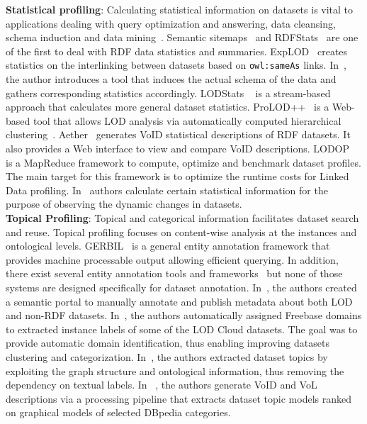 \textbf{Statistical profiling}: Calculating statistical information on datasets is vital to applications dealing with query optimization and answering, data cleansing, schema induction and data mining~\cite{Jentzsch:ISWC:14,Frosterus:Springer:11,Lalithsena:WI:13}. Semantic sitemaps~\cite{Cyganiak:ESWC:08} and RDFStats~\cite{Lanegger:DEXA:09} are one of the first to deal with RDF data statistics and summaries. ExpLOD~\cite{Khatchadourian:ESWC:10} creates statistics on the interlinking between datasets based on \texttt{owl:sameAs} links. In~\cite{Li:WISM:12}, the author introduces a tool that induces the actual schema of the data and gathers corresponding statistics accordingly. LODStats ~\cite{Auer:EKAW:12} is a stream-based approach that calculates more general dataset statistics. ProLOD++~\cite{Abedjan:ICDE:14} is a Web-based tool that allows LOD analysis via automatically computed hierarchical clustering~\cite{Bohm:ICDEW:10}. Aether~\cite{Makela:ESWC:14} generates VoID statistical descriptions of RDF datasets. It also provides a Web interface to view and compare VoID descriptions. LODOP~\cite{Forchhammer:PROFILES:14} is a MapReduce framework to compute, optimize and benchmark dataset profiles. The main target for this framework is to optimize the runtime costs for Linked Data profiling. In~\cite{Kaafer:ESWC:13} authors calculate certain statistical information for the purpose of observing the dynamic changes in datasets.\\

\textbf{Topical Profiling}: Topical and categorical information facilitates dataset search and reuse. Topical profiling focuses on content-wise analysis at the instances and ontological levels. GERBIL~\cite{Usbeck:WWW:15} is a general entity annotation framework that provides machine processable output allowing efficient querying. In addition, there exist several entity annotation tools and frameworks~\cite{Cornolti:WWW:13} but none of those systems are designed specifically for dataset annotation. In~\cite{Frosterus:ESWC:11}, the authors created a semantic portal to manually annotate and publish metadata about both LOD and non-RDF datasets. In~\cite{Lalithsena:WI:13}, the authors automatically assigned Freebase domains to extracted instance labels of some of the LOD Cloud datasets. The goal was to provide automatic domain identification, thus enabling improving datasets clustering and categorization. In~\cite{Bohm:CIKM:12}, the authors extracted dataset topics by exploiting the graph structure and ontological information, thus removing the dependency on textual labels. In ~\cite{Fetahu:ESWC:14}, the authors generate VoID and VoL descriptions via a processing pipeline that extracts dataset topic models ranked on graphical models of selected DBpedia categories.\\

